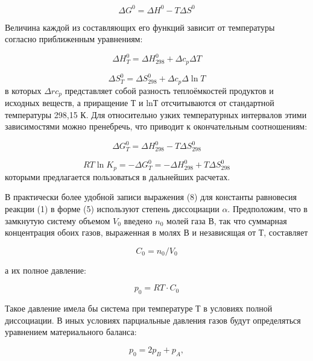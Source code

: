 \documentclass[a4paper,12pt]{article} %
\begin{document}
\begin{equation}
 \Delta G^0 = \Delta H^0 - T \Delta S^0
\end{equation}

Величина каждой из составляющих его функций зависит от температуры согласно приближенным уравнениям:

\begin{equation}
 \Delta H_T^0 = \Delta H_{298}^0 + \Delta c_p \Delta T
\end{equation}

\begin{equation}
 \Delta S_T^0 = \Delta S_{298}^0 + \Delta c_p \Delta \ln{T}
\end{equation}
в которых \(\Delta r c_p\) представляет собой разность теплоёмкостей продуктов и исходных веществ, а приращение Т и lnТ отсчитываются от стандартной температуры 298,15 К. Для относительно узких температурных интервалов этими зависимостями можно пренебречь, что приводит к окончательным соотношениям:

\begin{equation}
 \Delta G_T^0 = \Delta H_{298}^0 - T \Delta S_{298}^0
\end{equation}

\begin{equation}
 RT \ln K_p = - \Delta G_T^0 = -\Delta H_{298}^0 + T \Delta S_{298}^0
\end{equation}
которыми предлагается пользоваться в дальнейших расчетах.
	
В практически более удобной записи выражения (8) для константы равновесия реакции (1) в форме (5) используют степень диссоциации \(\alpha\). Предположим, что в замкнутую систему объемом \(V_0\) введено \(n_0\) молей газа В, так что суммарная концентрация обоих газов, выраженная в молях В и независящая от Т, составляет

\begin{equation}
 C_0 = n_0 /V_0
\end{equation}

а их полное давление:

\begin{equation}
 p_0 = RT \cdot C_0
\end{equation}

Такое давление имела бы система при температуре Т в условиях полной диссоциации. В иных условиях парциальные давления газов будут определяться уравнением материального баланса:

\begin{equation}
 p_0 = 2p_B + p_A,
\end{equation}
\end{document}
